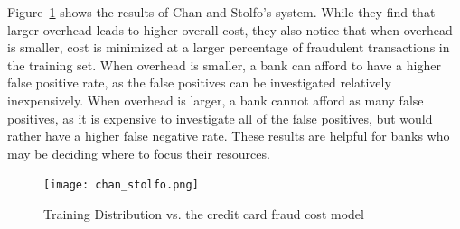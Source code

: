 \documentclass[midd]{thesis}
\begin{document}
Figure~\ref{fig:chan} shows the results of Chan and Stolfo's system. While they find that larger overhead leads to higher overall cost, they also notice that when overhead is smaller, cost is minimized at a larger percentage of fraudulent transactions in the training set. When overhead is smaller, a bank can afford to have a higher false positive rate, as the false positives can be investigated relatively inexpensively. When overhead is larger, a bank cannot afford as many false positives, as it is expensive to investigate all of the false positives, but would rather have a higher false negative rate. These results are helpful for banks who may be deciding where to focus their resources.


\begin{figure}
  \texttt{[image: chan\_stolfo.png]}
  \caption{Training Distribution vs. the credit card fraud cost model \cite{Chan}}
  \label{fig:chan}
\end{figure}

%
\end{document}
